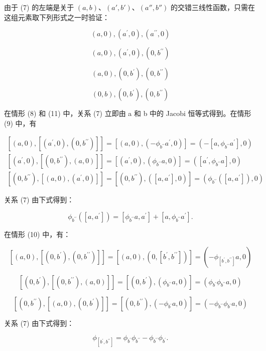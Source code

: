 由于 (7) 的左端是关于 \((a, b)\)、\((a', b')\)、\((a'', b'')\) 的交错三线性函数，只需在这组元素取下列形式之一时验证：

\[
(a, 0), (a ^ {\prime}, 0), (a ^ {\prime \prime}, 0)\tag{8}
\]

\[
(a, 0), (a ^ {\prime}, 0), (0, b ^ {\prime \prime})\tag{9}
\]

\[
(a, 0), (0, b ^ {\prime}), (0, b ^ {\prime \prime})\tag{10}
\]

\[
(0, b), (0, b ^ {\prime}), (0, b ^ {\prime \prime})\tag{11}
\]

在情形 (8) 和 (11) 中，关系 (7) 立即由 a 和 b 中的 Jacobi 恒等式得到。在情形 (9) 中，有

\[
\begin{array}{l} [ (a, 0), [ (a ^ {\prime}, 0), (0, b ^ {\prime \prime}) ] ] = [ (a, 0), (- \phi_ {b ^ {\prime \prime}} a ^ {\prime}, 0) ] = (- [ a, \phi_ {b ^ {\prime \prime}} a ^ {\prime} ], 0) \\ {} [ (a ^ {\prime}, 0), [ (0, b ^ {\prime \prime}), (a, 0) ] ] = [ (a ^ {\prime}, 0), (\phi_ {b ^ {\prime \prime}} a, 0) ] = ([ a ^ {\prime}, \phi_ {b ^ {\prime \prime}} a ], 0) \\ {} [ (0, b ^ {\prime \prime}), [ (a, 0), (a ^ {\prime}, 0) ] ] = [ (0, b ^ {\prime \prime}), ([ a, a ^ {\prime} ], 0) ] = (\phi_ {b ^ {\prime \prime}} ([ a, a ^ {\prime} ]), 0) \end{array}
\]

关系 (7) 由下式得到：

\[
\phi_ {b ^ {\prime \prime}} ([ a, a ^ {\prime} ]) = [ \phi_ {b ^ {\prime \prime}} a, a ^ {\prime} ] + [ a, \phi_ {b ^ {\prime \prime}} a ^ {\prime} ].
\]

在情形 (10) 中，有：

\[
[ (a, 0), [ (0, b ^ {\prime}), (0, b ^ {\prime \prime}) ] ] = [ (a, 0), (0, [ b ^ {\prime}, b ^ {\prime \prime} ]) ] = (- \phi_ {[ b ^ {\prime}, b ^ {\prime \prime} ]} a, 0)
\]

\[
[ (0, b ^ {\prime}), [ (0, b ^ {\prime \prime}), (a, 0) ] ] = [ (0, b ^ {\prime}), (\phi_ {b ^ {\prime \prime}} a, 0) ] = (\phi_ {b ^ {\prime}} \phi_ {b ^ {\prime \prime}} a, 0)
\]

\[
[ (0, b ^ {\prime \prime}), [ (a, 0), (0, b ^ {\prime}) ] ] = [ (0, b ^ {\prime \prime}), (- \phi_ {b ^ {\prime}} a, 0) ] = (- \phi_ {b ^ {\prime \prime}} \phi_ {b ^ {\prime}} a, 0)
\]

关系 (7) 由下式得到：

\[
\phi_ {[ b ^ {\prime}, b ^ {\prime \prime} ]} = \phi_ {b ^ {\prime}} \phi_ {b ^ {\prime \prime}} - \phi_ {b ^ {\prime \prime}} \phi_ {b ^ {\prime}}.
\]

